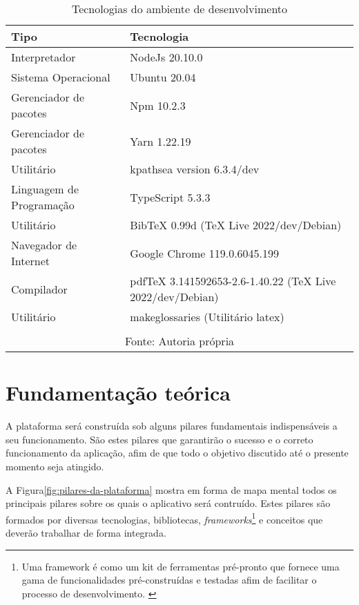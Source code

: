 \begin{table}[H]
    \centering
    \caption{Tecnologias do ambiente de desenvolvimento}
    \label{tbl:tecnologias-ambiente}
    \renewcommand{\arraystretch}{1.5}
    \begin{tabular}{p{6.4cm} p{9.6cm}}
        \hline
        \textbf{Tipo} & \textbf{Tecnologia} \\
        \hline
        Interpretador & NodeJs 20.10.0 \\
		Sistema Operacional & Ubuntu 20.04 \\
		Gerenciador de pacotes & Npm 10.2.3 \\
		Gerenciador de pacotes & Yarn 1.22.19 \\
		Utilitário & kpathsea version 6.3.4/dev \\
		Linguagem de Programação & TypeScript 5.3.3 \\
		Utilitário & BibTeX 0.99d (TeX Live 2022/dev/Debian) \\
		Navegador de Internet & Google Chrome 119.0.6045.199 \\
		Compilador & pdfTeX 3.141592653-2.6-1.40.22 (TeX Live 2022/dev/Debian) \\
		Utilitário & makeglossaries (Utilitário \acrshort{latex}) \\
        \hline
        \\\multicolumn{2}{c}{\fontsize{10pt}{12pt}Fonte: Autoria própria}
    \end{tabular}
\end{table}

\chapter{Fundamentação teórica}

A plataforma será construída sob alguns pilares fundamentais indispensáveis
a seu funcionamento. São estes pilares que garantirão o sucesso e o correto
funcionamento da aplicação, afim de que todo o objetivo discutido até o
presente momento seja atingido.

A
Figura\ref{fig:pilares-da-plataforma}
mostra em forma de mapa mental todos os principais pilares sobre os quais
o aplicativo será contruído. Estes pilares são formados por diversas
tecnologias, bibliotecas,
\textit{frameworks}\footnote{Uma framework é como um kit de ferramentas pré-pronto que fornece uma gama
    de funcionalidades pré-construídas e testadas afim de facilitar o processo
    de desenvolvimento. \cite{amazon-framework}
}
e conceitos que deverão trabalhar de forma integrada.


